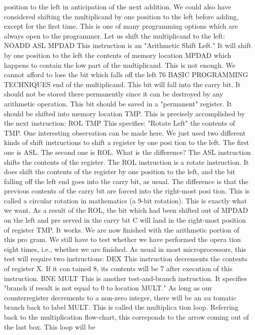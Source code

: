 \documentclass{book}
\begin{document}
position to the left in anticipation of the next addition. We could
also have considered shifting the multiplicand by one position
to the left before adding, except for the first time. This is one of many
programming options which are always open to the programmer.
Let us shift the multiplicand to the left:
NOADD ASL MPDAD
This instruction is an "Arithmetic Shift Left." It will shift by one
position to the left the contents of memory location MPDAD
which happens to contain the low part of the multiplicand. This is
not enough. We cannot afford to lose the bit which falls off the left
76
BASIC PROGRAMMING TECHNIQUES
end of the multiplicand. This bit will fall into the carry bit. It
should not be stored there permanently since it can be destroyed
by any arithmetic operation. This bit should be saved in a
"permanent" register. It should be shifted into memory location
TMP. This is precisely accomplished by the next instruction:
ROL TMP
This specifies: "Rotate Left" the contents of TMP.
One interesting observation can be made here. We just used two
different kinds of shift instructions to shift a register by one posi
tion to the left. The first one is ASL. The second one is ROL.
What is the difference?
The ASL instruction shifts the contents of the register. The
ROL instruction is a rotate instruction. It does shift the contents
of the register by one position to the left, and the bit falling off the
left end goes into the carry bit, as usual. The difference is that the
previous contents of the carry bit are forced into the right-most posi
tion. This is called a circular rotation in mathematics (a 9-bit
rotation). This is exactly what we want. As a result of the ROL,
the bit which had been shifted out of MPDAD on the left and pre
served in the carry bit C will land in the right-most position of
register TMP. It works.
We are now finished with the arithmetic portion of this pro
gram. We still have to test whether we have performed the opera
tion eight times, i.e., whether we are finished. As usual in most
microprocessors, this test will require two instructions:
DEX
This instruction decrements the contents of register X. If it con
tained 8, its contents will be 7 after execution of this instruction.
BNE MULT
This is another test-and-branch instruction. It specifies "branch if
result is not equal to 0 to location MULT." As long as our counterregister
decrements to a non-zero integer, there will be an au
tomatic branch back to label MULT. This is called the multiplica
tion loop. Referring back to the multiplication flow-chart, this correponds
to the arrow coming out of the last box. This loop will be
\end{document}
